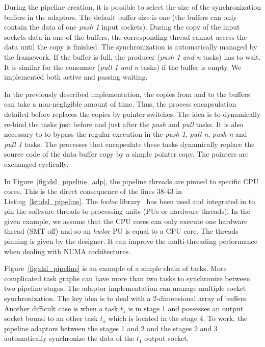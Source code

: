 During the pipeline creation, it is possible to select the size of the
synchronization buffers in the adaptors. The default buffer size is one (the
buffers can only contain the data of one \emph{push 1} input sockets). During
the copy of the input sockets data in one of the buffers, the corresponding
thread cannot access the data until the copy is finished. The synchronization is
automatically managed by the framework. If the buffer is full, the producer
(\emph{push 1 and n} tasks) has to wait. It is similar for the consumer
(\emph{pull 1 and n} tasks) if the buffer is empty. We implemented both active
and passing waiting.

In the previously described implementation, the copies from and to the buffers
can take a non-negligible amount of time. Thus, the process encapsulation
detailed before replaces the copies by pointer switches. The idea is to
dynamically re-bind the tasks just before and just after the \emph{push} and
\emph{pull} tasks. It is also necessary to to bypass the regular execution in
the \emph{push 1}, \emph{pull n}, \emph{push n} and \emph{pull 1} tasks. The
processes that encapsulate these tasks dynamically replace the source code of
the data buffer copy by a simple pointer copy. The pointers are exchanged
cyclically.

In Figure~\ref{fig:dsl_pipeline_adp}, the pipeline threads are pinned to
specific CPU cores. This is the direct consequence of the lines 38-43 in
Listing~\ref{lst:dsl_pipeline}. The \emph{hwloc} library~\cite{Broquedis2010}
has been used and integrated in \AFFECT to pin the software threads to
processing units (PUs or hardware threads). In the given example, we assume that
the CPU cores can only execute one hardware thread (SMT off) and so an
\emph{hwloc} PU is equal to a CPU core. The threads pinning is given by the
designer. It can improve the multi-threading performance when dealing with NUMA
architectures.

Figure~\ref{fig:dsl_pipeline} is an example of a simple chain of tasks. More
complicated task graphs can have more than two tasks to synchronize between two
pipeline stages. The adaptor implementation can manage multiple socket
synchronization. The key idea is to deal with a 2-dimensional array of buffers.
Another difficult case is when a task $t_1$ is in stage 1 and possesses an
output socket bound to an other task $t_{x}$ which is located in the stage 4.
To work, the pipeline adaptors between the stages 1 and 2 and the stages 2 and 3
automatically synchronize the data of the $t_1$ output socket.

